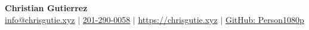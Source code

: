 \documentclass{article}
\begin{document}
\begin{center}
\thispagestyle{empty}
\large \textbf{Christian Gutierrez \\}
\normalsize \href{mailto:info@chrisgutie.xyz}{info@chrisgutie.xyz} $\mid$ \href{tel:2012900058}{201-290-0058} $\mid$ \href{https://chrisgutie.xyz}{https://chrisgutie.xyz}
 $\mid$ \href{https://github.com/Person1080p}{GitHub: Person1080p}    \\
\hrulefill
\end{center}







\end{document}
